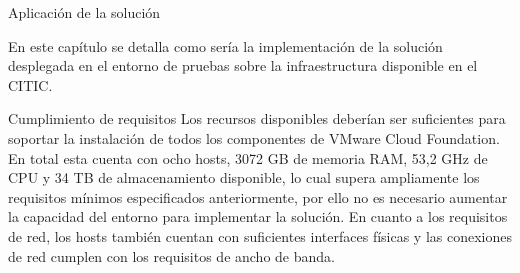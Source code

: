 \begin{chapter}{Aplicación de la solución}

En este capítulo se detalla como sería la implementación de la solución desplegada en el entorno de pruebas sobre la infraestructura disponible en el CITIC.

\begin{section}{Cumplimiento de requisitos}
Los recursos disponibles deberían ser suficientes para soportar la instalación de todos los componentes de VMware Cloud Foundation. En total esta cuenta con ocho hosts, 3072 GB de memoria RAM, 53,2 GHz de CPU y 34 TB de almacenamiento disponible, lo cual supera ampliamente los requisitos mínimos especificados anteriormente, por ello no es necesario aumentar la capacidad del entorno para implementar la solución. En cuanto a los requisitos de red, los hosts también cuentan con suficientes interfaces físicas y las conexiones de red cumplen con los requisitos de ancho de banda.
\end{section}


\end{chapter}
